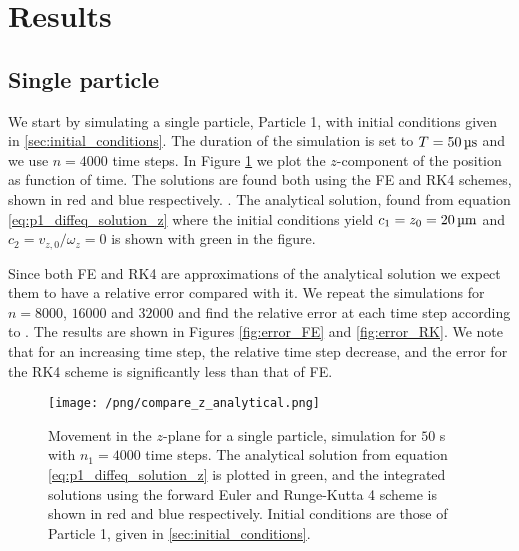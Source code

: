 \section{Results}\label{sec:results}

\subsection{Single particle}
We start by simulating a single particle, Particle 1, with initial conditions given in \ref{sec:initial_conditions}. The duration of the simulation is set to $T = 50 \,\mathrm{\text{\textmu} s}$ and we use $n=4000$ time steps. In Figure \ref{fig:compare_z_analytical} we plot the $z$-component of the position as function of time. The solutions are found both using the FE and RK4 schemes, shown in red and blue respectively.  . The analytical solution, found from equation \eqref{eq:p1_diffeq_solution_z} where the initial conditions yield $c_1 = z_0 = 20\,\mathrm{\text{\textmu}m}$ and $c_2 = v_{z,0}/\omega_z= 0$ is shown with green in the figure.

Since both FE and RK4 are approximations of the analytical solution we expect them to have a relative error compared with it. We repeat the simulations for $n = 8000$, $16000$ and $32000$ and find the relative error at each time step according to . The results are shown in Figures \ref{fig:error_FE} and \ref{fig:error_RK}. We note that for an increasing time step, the relative time step decrease, and the error for the RK4 scheme is significantly less than that of FE. 

\begin{figure}
    \texttt{[image: /png/compare\_z\_analytical.png]}
    \caption{Movement in the $z$-plane for a single particle, simulation for $50$ \textmu s with $n_1=4000$ time steps. The analytical solution from equation \eqref{eq:p1_diffeq_solution_z} is plotted in green, and the integrated solutions using the forward Euler and Runge-Kutta 4 scheme is shown in red and blue respectively. Initial conditions are those of Particle 1, given in \ref{sec:initial_conditions}.}
    \label{fig:compare_z_analytical}
\end{figure}


